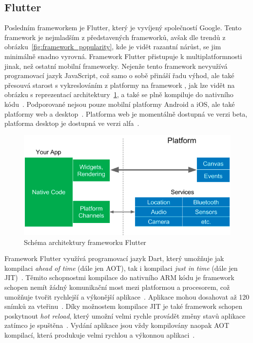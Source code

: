 \subsection{Flutter}

Posledním frameworkem je Flutter,
který je vyvíjený společností Google.
Tento framework je nejmladším z představených frameworků,
avšak dle trendů z obrázku~\ref{fig:framework_popularity},
kde je vidět razantní nárůst,
se jim minimálně snadno vyrovná.
Framework Flutter přistupuje k multiplatformnosti jinak,
než ostatní mobilní frameworky.
Nejenže tento framework nevyužívá programovací jazyk JavaScript,
což samo o sobě přináší řadu výhod,
ale také přesouvá starost s vykreslováním z platformy na framework
\cite{hackernoon_flutter},
jak lze vidět na obrázku s reprezentací
architektury~\ref{fig:framework_flutter},
a také se plně kompiluje do nativního
kódu~\cite{dashmagazine_mobile_frameworks}.
Podporované nejsou pouze mobilní platformy Android a iOS,
ale také platformy web a desktop~\cite{flutter}.
Platforma web je momentálně dostupná ve verzi beta,
platforma desktop je dostupná ve verzi alfa~\cite{flutter_web, flutter_desktop}.

\begin{figure}[ht!]
    \centering
    \includegraphics[width=\linewidth]{assets/technology-research/framework/flutter.png}
    \caption{Schéma architektury frameworku Flutter
    ~\cite{hackernoon_flutter}}
    \label{fig:framework_flutter}
\end{figure}

Framework Flutter využívá programovací jazyk Dart,
který umožňuje jak kompilaci \emph{ahead of time} (dále jen AOT),
tak i kompilaci \emph{just in time} (dále jen JIT)~\cite{hackernoon_flutter}.
Těmito schopnostmi kompilace do nativního ARM kódu je framework schopen
nemít žádný komunikační most mezi platformou a procesorem,
což umožňuje tvořit rychlejší
a výkonější aplikace~\cite{dashmagazine_mobile_frameworks}.
Aplikace mohou dosahovat až 120 snímků
za vteřinu~\cite{dashmagazine_mobile_frameworks}.
Díky možnostem kompilace JIT je také framework schopen poskytnout
\emph{hot reload},
který umožní velmi rychle provádět změny stavů aplikace zatímco
je spuštěna~\cite{hackernoon_flutter}.
Vydání aplikace jsou vždy kompilovány naopak AOT kompilací,
která produkuje velmi rychlou a výkonnou aplikaci~\cite{hackernoon_flutter}.

